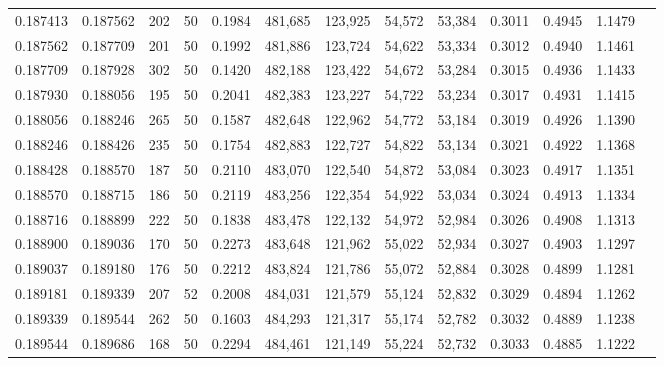 \begin{tabular}{rrrrrrrrrrrrr}
0.187413 & 0.187562 &   202 &  50 &                                     0.1984 & 481,685 & 123,925 &  54,572 &  53,384 & 0.3011 & 0.4945 & 1.1479 \\
0.187562 & 0.187709 &   201 &  50 &                                     0.1992 & 481,886 & 123,724 &  54,622 &  53,334 & 0.3012 & 0.4940 & 1.1461 \\
0.187709 & 0.187928 &   302 &  50 &                                     0.1420 & 482,188 & 123,422 &  54,672 &  53,284 & 0.3015 & 0.4936 & 1.1433 \\
0.187930 & 0.188056 &   195 &  50 &                                     0.2041 & 482,383 & 123,227 &  54,722 &  53,234 & 0.3017 & 0.4931 & 1.1415 \\
0.188056 & 0.188246 &   265 &  50 &                                     0.1587 & 482,648 & 122,962 &  54,772 &  53,184 & 0.3019 & 0.4926 & 1.1390 \\
0.188246 & 0.188426 &   235 &  50 &                                     0.1754 & 482,883 & 122,727 &  54,822 &  53,134 & 0.3021 & 0.4922 & 1.1368 \\
0.188428 & 0.188570 &   187 &  50 &                                     0.2110 & 483,070 & 122,540 &  54,872 &  53,084 & 0.3023 & 0.4917 & 1.1351 \\
0.188570 & 0.188715 &   186 &  50 &                                     0.2119 & 483,256 & 122,354 &  54,922 &  53,034 & 0.3024 & 0.4913 & 1.1334 \\
0.188716 & 0.188899 &   222 &  50 &                                     0.1838 & 483,478 & 122,132 &  54,972 &  52,984 & 0.3026 & 0.4908 & 1.1313 \\
0.188900 & 0.189036 &   170 &  50 &                                     0.2273 & 483,648 & 121,962 &  55,022 &  52,934 & 0.3027 & 0.4903 & 1.1297 \\
0.189037 & 0.189180 &   176 &  50 &                                     0.2212 & 483,824 & 121,786 &  55,072 &  52,884 & 0.3028 & 0.4899 & 1.1281 \\
0.189181 & 0.189339 &   207 &  52 &                                     0.2008 & 484,031 & 121,579 &  55,124 &  52,832 & 0.3029 & 0.4894 & 1.1262 \\
0.189339 & 0.189544 &   262 &  50 &                                     0.1603 & 484,293 & 121,317 &  55,174 &  52,782 & 0.3032 & 0.4889 & 1.1238 \\
0.189544 & 0.189686 &   168 &  50 &                                     0.2294 & 484,461 & 121,149 &  55,224 &  52,732 & 0.3033 & 0.4885 & 1.1222 \\

\end{tabular}
